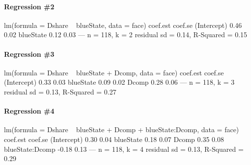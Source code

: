 \documentclass[addpoints,12pt]{exam}
\begin{document}
\begin{questions}
\paragraph{\footnotesize Regression \#2}
\begin{boxedverbatim}
lm(formula = Dshare ~ blueState, data = face)
            coef.est coef.se
(Intercept) 0.46     0.02
blueState   0.12     0.03
---
n = 118, k = 2
residual sd = 0.14, R-Squared = 0.15
\end{boxedverbatim}
\vspace{-1em}

\paragraph{\footnotesize Regression \#3}
\begin{boxedverbatim}
lm(formula = Dshare ~ blueState + Dcomp, data = face)
            coef.est coef.se
(Intercept) 0.33     0.03
blueState   0.09     0.02
Dcomp       0.28     0.06
---
n = 118, k = 3
residual sd = 0.13, R-Squared = 0.27
\end{boxedverbatim}
\vspace{-1em}

\paragraph{\footnotesize Regression \#4}
\begin{boxedverbatim}
lm(formula = Dshare ~ blueState + Dcomp + blueState:Dcomp, data = face)
                coef.est coef.se
(Intercept)      0.30     0.04
blueState        0.18     0.07
Dcomp            0.35     0.08
blueState:Dcomp -0.18     0.13
---
n = 118, k = 4
residual sd = 0.13, R-Squared = 0.29
\end{boxedverbatim}


\end{questions}
\end{document}
